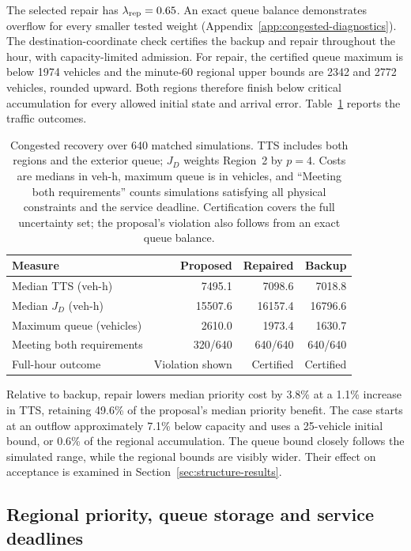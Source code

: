 \documentclass[final]{cas-sc}
\theoremstyle{definition}
\theoremstyle{plain}
\theoremstyle{definition}
\theoremstyle{plain}
\newcommand{\appref}[1]{Appendix~\ref{#1}}
\begin{document}
The selected repair has $\lambda_{\rm rep}=0.65$. An exact queue
balance demonstrates overflow for every smaller tested weight
(\appref{app:congested-diagnostics}). The destination-coordinate check
certifies the backup and repair throughout the hour, with
capacity-limited admission. For repair, the certified queue maximum is
below 1974 vehicles and the minute-60 regional upper bounds are 2342
and 2772 vehicles, rounded upward. Both regions therefore finish below
critical accumulation for every allowed initial state and arrival
error. Table~\ref{tab:congested-results} reports the traffic outcomes.
\begin{table}[pos=!htb]
\centering\small
\caption{Congested recovery over 640 matched simulations. TTS includes
both regions and the exterior queue; $J_D$ weights Region~2 by $p=4$.
Costs are medians in veh-h, maximum queue is in vehicles, and ``Meeting
both requirements'' counts simulations satisfying all physical
constraints and the service deadline. Certification covers the full
uncertainty set; the proposal's violation also follows from an exact
queue balance.}
\label{tab:congested-results}
\begin{tabularx}{\linewidth}{@{}Xrrr@{}}
\toprule
Measure & Proposed & Repaired & Backup\\
\midrule
Median TTS (veh-h) & 7495.1 & 7098.6 & 7018.8\\
Median $J_D$ (veh-h) & 15507.6 & 16157.4 & 16796.6\\
Maximum queue (vehicles) & 2610.0 & 1973.4 & 1630.7\\
Meeting both requirements & 320/640 & 640/640 & 640/640\\
Full-hour outcome & Violation shown & Certified & Certified\\
\bottomrule
\end{tabularx}
\end{table}

Relative to backup, repair lowers median priority cost by 3.8\% at a
1.1\% increase in TTS, retaining 49.6\% of the proposal's median
priority benefit. The case starts at an outflow approximately 7.1\%
below capacity and uses a 25-vehicle initial bound, or 0.6\% of the
regional accumulation. The queue bound closely follows the simulated
range, while the regional bounds are visibly wider. Their effect on
acceptance is examined in Section~\ref{sec:structure-results}.

\subsection{Regional priority, queue storage and service deadlines}
\label{sec:new-incident-protocol}
\label{sec:repair-results}
\end{document}
